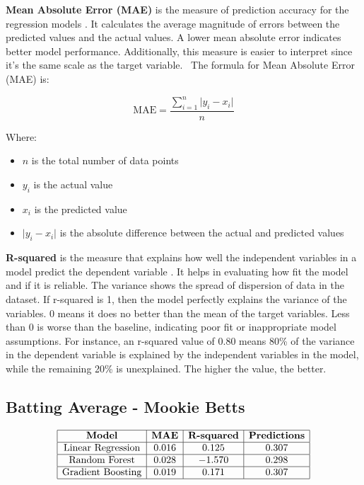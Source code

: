 \documentclass[10pt,twocolumn]{article}
\begin{document}
\textbf{Mean Absolute Error (MAE) }is the measure of prediction accuracy for the regression models \cite{19}. It calculates the average magnitude of errors between the predicted values and the actual values. A lower mean absolute error indicates better model performance. Additionally, this measure is easier to interpret since it’s the same scale as the target variable. 
The formula for Mean Absolute Error (MAE) is:

\[
\text{MAE} = \frac{\sum_{i=1}^{n} \lvert y_i - x_i \rvert}{n}
\]

Where:
\begin{itemize}
    \item $n$ is the total number of data points
    \item $y_i$ is the actual value
    \item $x_i$ is the predicted value
    \item $\lvert y_i - x_i \rvert$ is the absolute difference between the actual and predicted values
\end{itemize}

\textbf{R-squared} is the measure that explains how well the independent variables in a model predict the dependent variable \cite{20}. It helps in evaluating how fit the model and if it is reliable. The variance shows the spread of dispersion of data in the dataset. If r-squared is 1, then the model perfectly explains the variance of the variables. 0 means it does no better than the mean of the target variables. Less than 0 is worse than the baseline, indicating poor fit or inappropriate model assumptions. For instance, an r-squared value of 0.80 means 80\% of the variance in the dependent variable is explained by the independent variables in the model, while the remaining 20\% is unexplained. The higher the value, the better.

\subsection*{Batting Average - Mookie Betts}
\[
\begin{array}{|c|c|c|c|}
\hline
\textbf{Model} & \textbf{MAE} & \textbf{R-squared} & \textbf{Predictions} \\ \hline
\text{Linear Regression} & 0.016 & 0.125 & 0.307 \\ \hline
\text{Random Forest} & 0.028 & -1.570 & 0.298 \\ \hline
\text{Gradient Boosting} & 0.019 & 0.171 & 0.307 \\ \hline
\end{array}
\]
\end{document}
